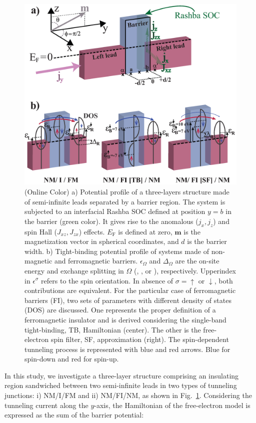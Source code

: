 \documentclass[10pt,pr,twocolumn,showpacs,amssymb,floatfix,superscriptaddress]{revtex4-1}
\newcommand{\tx}{\text}
\newcommand{\dna}{\downarrow}
\newcommand{\upa}{\uparrow}
\newcommand{\Dlt}{\Delta}
\newcommand{\eps}{\epsilon}
\newcommand{\Og}{\Omega}
\newcommand{\sg}{\sigma}
\begin{document}
\begin{figure}
\centering
\includegraphics[width=1.85\columnwidth,clip=false]{fig1.eps}
\caption{(Online Color) a) Potential profile of a three-layers structure made of semi-infinite leads separated by a barrier region. The system is subjected to an interfacial Rashba SOC defined at position $y=b$ in the barrier (green color). It gives rise to the anomalous ($j_x, j_z$) and spin Hall ($J_{xz}, J_{zx}$) effects.  $E_{\tx{F}}$ is defined at zero, $\bm m$ is the magnetization vector in spherical coordinates, and $d$ is the barrier width. b) Tight-binding potential profile of systems made of non-magnetic and ferromagnetic barriers.  $\eps_{\Og}$ and $\Dlt_{\Og}$ are the on-site energy and exchange splitting in $\Og$ (\tx{L}, \tx{R}, or \tx{B}), respectively. Upperindex in $\eps^\sg$ refers to the spin orientation. In absence of $\sg= \upa$ or $\dna$, both contributions are equivalent. For the particular case of ferromagnetic barriers (FI), two sets of parameters with different density of states (DOS) are discussed. One represents the proper definition of a ferromagnetic insulator and is derived considering the single-band tight-binding, TB, Hamiltonian (center). The other is the free-electron spin filter, SF, approximation (right). The spin-dependent tunneling process is represented with blue and red arrows. Blue for spin-down and red for spin-up.}
\label{fig:figu1}
\end{figure}
In this study, we investigate a three-layer structure comprising an insulating region sandwiched between two semi-infinite leads in two types of tunneling junctions: i) NM/I/FM and ii) NM/FI/NM, as shown in Fig.~\ref{fig:figu1}. Considering the tunneling current along the $y$-axis, the Hamiltonian of the free-electron model is expressed as the sum of the barrier potential:
\end{document}
